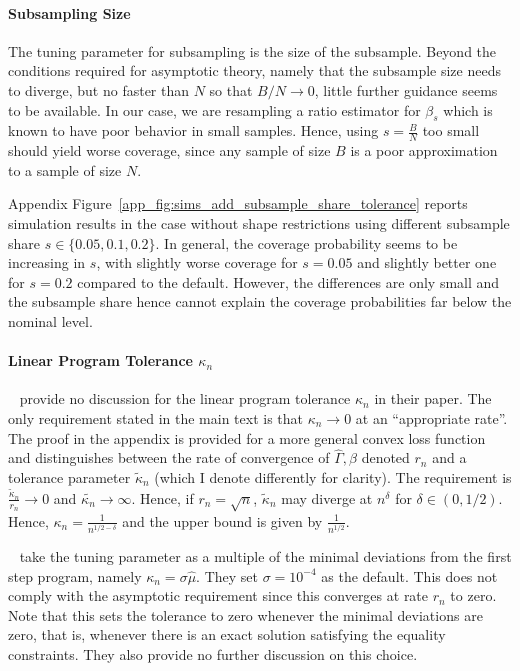 \documentclass[12pt,a4paper,english]{article} %
\numberwithin{equation}{section}
\theoremstyle{definition}
\theoremstyle{remark}
\theoremstyle{plain}
\begin{document}
\paragraph{Subsampling Size}
The tuning parameter for subsampling is the size of the subsample.
Beyond the conditions required for asymptotic theory, namely that the subsample size needs to diverge, but no faster than $N$ so that $B/N \to 0$, little further guidance seems to be available.
In our case, we are resampling a ratio estimator for $\beta_s$ which is known to have poor behavior in small samples.
Hence, using $s = \frac{B}{N}$ too small should yield worse coverage, since any sample of size $B$ is a poor approximation to a sample of size $N$.

Appendix Figure~\ref{app_fig:sims_add_subsample_share_tolerance} reports simulation results in the case without shape restrictions using different subsample share $s \in \{0.05, 0.1, 0.2\}$.
In general, the coverage probability seems to be increasing in $s$, with slightly worse coverage for $s=0.05$ and slightly better one for $s=0.2$ compared to the default.
However, the differences are only small and the subsample share hence cannot explain the coverage probabilities far below the nominal level.

\paragraph{Linear Program Tolerance $\kappa_n$}
~\cite{mogstad2018using} provide no discussion for the linear program tolerance $\kappa_n$ in their paper.
The only requirement stated in the main text is that $\kappa_n \to 0$ at an ``appropriate rate''.
The proof in the appendix is provided for a more general convex loss function and distinguishes between the rate of convergence of $\hat{\Gamma}, \hat{\beta}$ denoted $r_n$ and a tolerance parameter $\tilde{\kappa}_n$ (which I denote differently for clarity).
The requirement is $\frac{\tilde{\kappa}_n}{r_n} \to 0$ and $\tilde{\kappa_n}\to \infty$. Hence, if $r_n = \sqrt{n}$, $\tilde{\kappa}_n$ may diverge at $n^\delta$ for $\delta \in (0, 1/2)$.
Hence, $\kappa_n = \frac{1}{n^{1/2 - \delta}}$ and the upper bound is given by $\frac{1}{n^{1/2}}$.

~\cite{shea2023ivmte} take the tuning parameter as a multiple of the minimal deviations from the first step program, namely $\kappa_n = \sigma \hat{\mu}$. They set $\sigma = 10^{-4}$ as the default.
This does not comply with the asymptotic requirement since this converges at rate $r_n$ to zero.
Note that this sets the tolerance to zero whenever the minimal deviations are zero, that is, whenever there is an exact solution satisfying the equality constraints.
They also provide no further discussion on this choice.
\end{document}
